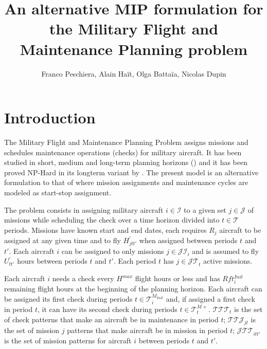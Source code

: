 \documentclass{roadef}
\begin{document}
\title{An alternative MIP formulation for the Military Flight and Maintenance Planning problem}

\author{Franco Peschiera, Alain Ha{\"i}t, Olga Batta{\"i}a, Nicolas Dupin}



\maketitle
\thispagestyle{empty}


\section{Introduction}
    The Military Flight and Maintenance Planning Problem assigns missions and schedules maintenance operations (checks) for military aircraft. It has been studied in short, medium and long-term planning horizons (\cite{Cho2011,Kozanidis2008,Verhoeff2015,PeschieraR2018}) and it has been proved NP-Hard in its longterm variant by \cite{Peschiera2019}. The present model is an alternative formulation to that of \cite{Peschiera2019} where mission assignments and maintenance cycles are modeled as start-stop assignment.

    The problem consists in assigning military aircraft $i \in \mathcal{I}$ to a given set $j \in \mathcal{J}$ of missions while scheduling the check over a time horizon divided into $t \in \mathcal{T}$ periods. Missions have known start and end dates, each requires $R_j$ aircraft to be assigned at any given time and to fly $H^\prime_{jtt'}$ when assigned between periods $t$ and $t'$. Each aircraft $i$ can be assigned to only missions $j \in \mathcal{JI}_i$ and is assumed to fly $U^{\prime}_{tt'}$ hours between periods $t$ and $t'$. Each period $t$ has $j \in \mathcal{JT}_t$ active missions.

    Each aircraft $i$ needs a check every $H^{max}$ flight hours or less and has $Rft^{Init}_i$ remaining flight hours at the beginning of the planning horizon. Each aircraft can be assigned its first check during periods $t \in \mathcal{T}^{M_{Init}}_i$ and, if assigned a first check in period $t$, it can have its second check during periods $t \in \mathcal{T}^{M+}_{t}$. $\mathcal{TTT}_t$ is the set of check patterns that make an aircraft be in maintenance in period $t$; $\mathcal{TTJ}_{jt}$ is the set of mission $j$ patterns that make aircraft be in mission in period $t$; $\mathcal{JTT}_{itt'}$ is the set of mission patterns for aircraft $i$ between periods $t$ and $t'$.
\end{document}

